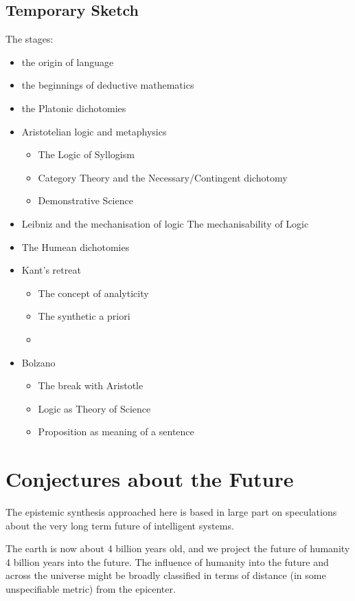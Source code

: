 \documentclass[10pt,titlepage]{article}
\begin{document}
\subsection{Temporary Sketch}

The stages:

\begin{itemize}
\item the origin of language
\item the beginnings of deductive mathematics
\item the Platonic dichotomies
\item Aristotelian logic and metaphysics
  \begin{itemize}
\item  The Logic of Syllogism
\item  Category Theory and the Necessary/Contingent dichotomy
\item  Demonstrative Science
  \end{itemize}
\item Leibniz and the mechanisation of logic
  The mechanisability of Logic
\item The Humean dichotomies
\item Kant's retreat
  \begin{itemize}
\item   The concept of analyticity
\item   The synthetic a priori
\item   \end{itemize}
\item Bolzano
  \begin{itemize}
\item   The break with Aristotle
\item   Logic as Theory of Science
\item   Proposition as meaning of a sentence
  \end{itemize}

\end{itemize}

\section{Conjectures about the Future}

The epistemic synthesis approached here is based in large part on speculations about the very long term future of intelligent systems.

The earth is now about 4 billion years old, and we project the future of humanity 4 billion years into the future.
The influence of humanity into the future and across the universe might be broadly classified in terms of distance (in some unspecifiable metric) from the epicenter.
\end{document}
